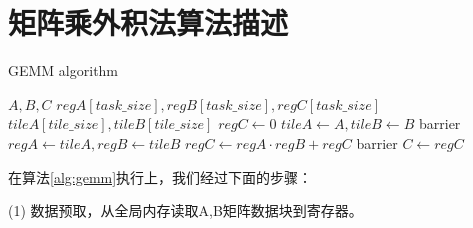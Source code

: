 \section{矩阵乘外积法算法描述}


\begin{algorithm}[htbp]
	\small
	\caption{GEMM algorithm}\label{alg:gemm}
	\begin{algorithmic}[1]
		\State $A, B, C$
		\State $regA[task\_size],regB[task\_size],regC[task\_size]$
		\State $tileA[tile\_size],tileB[tile\_size]$
		\State $regC \gets 0$
        \State $tileA \gets A, tileB \gets B $
        \State barrier
        \State $regA \gets tileA, regB \gets tileB$
        \State $regC \gets regA \cdot regB + regC$
        \EndFor
        \State barrier
		\EndWhile\label{gemmendwhile}
		\State $C \gets regC$
	\end{algorithmic}
\end{algorithm}

在算法\ref{alg:gemm}执行上，我们经过下面的步骤：

(1)	数据预取，从全局内存读取A,B矩阵数据块到寄存器。

